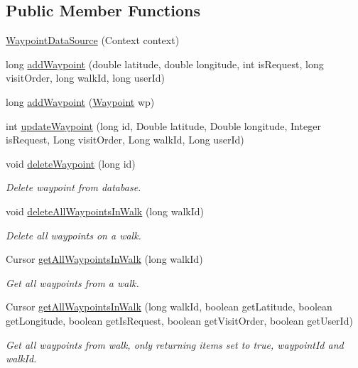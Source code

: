 \subsection*{Public Member Functions}
\begin{DoxyCompactItemize}
\item 
\hyperlink{classuk_1_1ac_1_1swan_1_1digitaltrails_1_1database_1_1_waypoint_data_source_ab011743a187bc9402a8e3ee4ff06ed58}{Waypoint\+Data\+Source} (Context context)
\item 
long \hyperlink{classuk_1_1ac_1_1swan_1_1digitaltrails_1_1database_1_1_waypoint_data_source_a0a5edeabdc390f34355fbca009a00310}{add\+Waypoint} (double latitude, double longitude, int is\+Request, long visit\+Order, long walk\+Id, long user\+Id)
\item 
long \hyperlink{classuk_1_1ac_1_1swan_1_1digitaltrails_1_1database_1_1_waypoint_data_source_af845370be817cbc70306ce869178a7a6}{add\+Waypoint} (\hyperlink{classuk_1_1ac_1_1swan_1_1digitaltrails_1_1components_1_1_waypoint}{Waypoint} wp)
\item 
int \hyperlink{classuk_1_1ac_1_1swan_1_1digitaltrails_1_1database_1_1_waypoint_data_source_ad555d4800c0b0006cf19a7aa0a655661}{update\+Waypoint} (long id, Double latitude, Double longitude, Integer is\+Request, Long visit\+Order, Long walk\+Id, Long user\+Id)
\item 
void \hyperlink{classuk_1_1ac_1_1swan_1_1digitaltrails_1_1database_1_1_waypoint_data_source_a1e05eaf5ffeb15c7d0cd86efc57c842b}{delete\+Waypoint} (long id)
\begin{DoxyCompactList}\small\item\em Delete waypoint from database. \end{DoxyCompactList}\item 
void \hyperlink{classuk_1_1ac_1_1swan_1_1digitaltrails_1_1database_1_1_waypoint_data_source_af0b817a0e56b59a39fef0774c351aa1f}{delete\+All\+Waypoints\+In\+Walk} (long walk\+Id)
\begin{DoxyCompactList}\small\item\em Delete all waypoints on a walk. \end{DoxyCompactList}\item 
Cursor \hyperlink{classuk_1_1ac_1_1swan_1_1digitaltrails_1_1database_1_1_waypoint_data_source_af8fc0c67b3637ed3a369cf5589b377a7}{get\+All\+Waypoints\+In\+Walk} (long walk\+Id)
\begin{DoxyCompactList}\small\item\em Get all waypoints from a walk. \end{DoxyCompactList}\item 
Cursor \hyperlink{classuk_1_1ac_1_1swan_1_1digitaltrails_1_1database_1_1_waypoint_data_source_ae00810c200b0586cfd02c80a053024c3}{get\+All\+Waypoints\+In\+Walk} (long walk\+Id, boolean get\+Latitude, boolean get\+Longitude, boolean get\+Is\+Request, boolean get\+Visit\+Order, boolean get\+User\+Id)
\begin{DoxyCompactList}\small\item\em Get all waypoints from walk, only returning items set to true, waypoint\+Id and walk\+Id. \end{DoxyCompactList}\end{DoxyCompactItemize}
